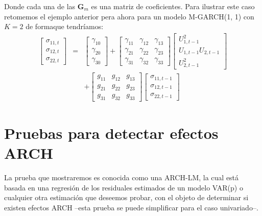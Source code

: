 \documentclass[
]{book}
\begin{document}
Donde cada una de las \(\mathbf{G}_m\) es una matriz de coeficientes. Para ilustrar este caso retomemos el ejemplo anterior pera ahora para un modelo M-GARCH(1, 1) con \(K = 2\) de formaque tendríamos:
\begin{eqnarray*}
    \begin{bmatrix}
    \sigma_{11, t} \\ \sigma_{12, t} \\ \sigma_{22, t}
    \end{bmatrix} & = &
    \begin{bmatrix}
    \gamma_{10} \\ \gamma_{20} \\ \gamma_{30}
    \end{bmatrix} +
    \begin{bmatrix}
    \gamma_{11} & \gamma_{12} & \gamma_{13} \\ \gamma_{21} & \gamma_{22} & \gamma_{23} \\ \gamma_{31} & \gamma_{32} & \gamma_{33}
    \end{bmatrix} 
    \begin{bmatrix}
    U^2_{1, t-1} \\ U_{1, t-1} U_{2, t-1} \\ U^2_{2, t-1}
    \end{bmatrix} \\
    & & + 
    \begin{bmatrix}
    g_{11} & g_{12} & g_{13} \\ g_{21} & g_{22} & g_{23} \\ g_{31} & g_{32} & g_{33}
    \end{bmatrix} 
    \begin{bmatrix}
    \sigma_{11, t-1} \\ \sigma_{12, t-1} \\ \sigma_{22, t-1}
    \end{bmatrix}
\end{eqnarray*}

\hypertarget{pruebas-para-detectar-efectos-arch}{%
\section{Pruebas para detectar efectos ARCH}\label{pruebas-para-detectar-efectos-arch}}

La prueba que mostraremos es conocida como una ARCH-LM, la cual está basada en una regresión de los residuales estimados de un modelo VAR(p) o cualquier otra estimación que deseemos probar, con el objeto de determinar si existen efectos ARCH --esta prueba se puede simplificar para el caso univariado--.
\end{document}
